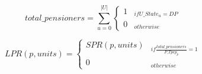 \begin{equation}
total\_pensioners =  \sum_{u=0}^{|U|} \begin{cases} 
1  & _{if U\_State_{u} = DP}\\
0 & _{otherwise}
\end{cases}
\end{equation}

\begin{equation}
LPR(p, units) =  \begin{cases} 
SPR(p, units)  & _{if \frac{total\_pensioners} {P\_Tpep_{p}} = 1}\\
0 & _{otherwise}
\end{cases}
\end{equation}$  $